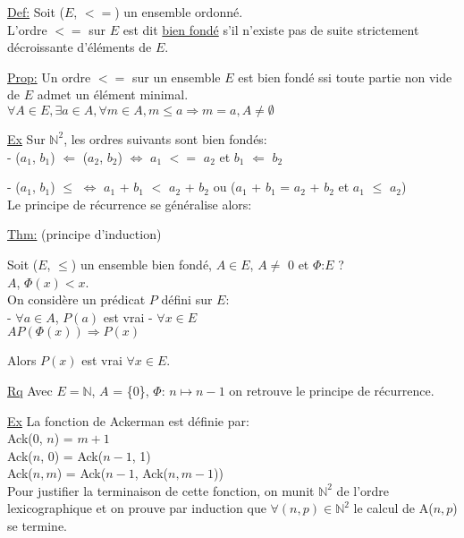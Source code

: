 \documentclass{article}
\begin{document}
				\underline{Def:} Soit ($E$, $<=$) un ensemble ordonné.\\
				L'ordre $<=$ sur $E$ est dit \underline{bien fondé} s'il n'existe pas de suite strictement décroissante d'éléments de $E$.
				
				\underline{Prop:} Un ordre $<=$ sur un ensemble $E$ est bien fondé ssi toute partie non vide de $E$ admet un élément minimal.\\
				$\forall A \in E, \exists a \in A, \forall m \in A, m \leq a \Rightarrow m = a, A \neq \emptyset$
				
				\underline{Ex} Sur $\mathbb{N}^2$, les ordres suivants sont bien fondés:\\
				- ($a_1$, $b_1$) $\Leftarrow$ ($a_2$, $b_2$) $\iff$ $a_1$ $<=$ $a_2$ et $b_1$ $\Leftarrow$ $b_2$
				
				- ($a_1$, $b_1$) $\leq$ $\iff$ $a_1$ + $b_1$ $<$ $a_2$ + $b_2$ ou ($a_1$ + $b_1$ = $a_2$ + $b_2$ et $a_1$ $\leq$ $a_2$)\\
				Le principe de récurrence se généralise alors:
				
				\underline{Thm:} (principe d'induction)
				
				Soit ($E$, $\leq$) un ensemble bien fondé, $A \in E$, $A \neq$ 0 et $\Phi$:$E$ ?\\$A$, $\Phi(x) < x$.\\
				On considère un prédicat $P$ défini sur $E$:\\
				- $\forall a \in A$, $P(a)$ est vrai
				- $\forall x \in E$\\
				$A P(\Phi(x)) \Rightarrow P(x)$
				
				Alors $P(x)$ est vrai $\forall x \in E$.
				
			  \underline{Rq} Avec $E = \mathbb{N}$, $A$ = \{0\}, $\Phi$: $n \longmapsto n - 1$ on retrouve le principe de récurrence.
				
				\underline{Ex} La fonction de Ackerman est définie par:\\
				Ack(0, $n$) = $m + 1$\\
				Ack($n$, 0) = Ack($n - 1$, 1)\\
				Ack($n, m$) = Ack($n - 1$, Ack($n, m - 1$))\\
				
				Pour justifier la terminaison de cette fonction, on munit $\mathbb{N}^2$ de l'ordre lexicographique et on prouve par induction que $\forall(n, p) \in \mathbb{N}^2$ le calcul de A($n, p$) se termine.\\
				
\end{document}
